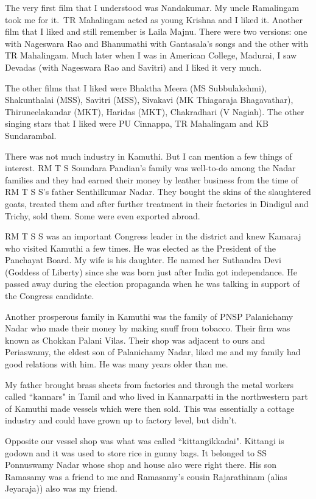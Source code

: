 The very first film that I understood was Nandakumar. My uncle 
Ramalingam took me for it.\ TR Mahalingam acted as young Krishna and I 
liked it. Another film that I liked and still remember is Laila Majnu. 
There were two versions: one with Nageswara Rao and Bhanumathi with 
Gantasala's songs and the other with TR Mahalingam. Much later when I 
was in American\- College, Madurai, I saw Devadas (with Nageswara Rao and 
Savitri) and I liked it very much.

The other films that I liked were Bhaktha Meera (MS Subbu\-lakshmi), Shakunthalai (MSS), Savitri (MSS), Sivakavi (MK Thia\-garaja Bhagavathar), Thiruneelakandar (MKT), Haridas (MKT), Chakradhari (V Nagiah). The other singing stars that I liked were PU Cinnappa, TR Mahalingam and KB Sunda\-rambal.

There was not much industry in Kamuthi. But I can mention a few things 
of interest. RM T S Soundara Pandian's family was well-to-do among the 
Nadar families and they had earned their money by leather business from 
the time of RM T S S's father Senthilkumar Nadar. They bought the skins 
of the slaughtered goats, treated them and after further treatment in 
their factories in Dindigul and Trichy, sold them. Some were even 
exported abroad.

RM T S S was an important Congress leader in the district and knew 
Kamaraj who visited Kamuthi a few times. He was elected as the President 
of the Panchayat Board. My wife is his daughter. He named her Suthandra 
Devi (Goddess of Liberty) since she was born just after India got 
independance. He passed away during the election propaganda when he was 
talking in support of the Congress candidate.

Another prosperous family in Kamuthi was the family of PN\-SP Palanichamy 
Nadar who made their money by making snuff from tobacco. Their firm was 
known as Chokkan Palani Vilas. Their shop was adjacent to ours and 
Periaswamy, the eldest son of Palanichamy Nadar, liked me and my family 
had good relations with him. He was many years older than me.

My father brought brass sheets from factories and through the metal 
workers called ``kannars" in Tamil and who lived in Kannarpatti in the 
northwestern part of Kamuthi made vessels which were then sold. This was 
essentially a cottage industry and could have grown up to factory level, 
but didn't.

Opposite our vessel shop was what was called ``kittangikka\-dai". Kittangi 
is godown and it was used to store rice in gunny bags. It belonged to SS 
Ponnuswamy Nadar whose shop and hou\-se also were right there. His son 
Ramasamy was a friend to me and Ramasamy's cousin Rajarathinam (alias 
Jeyaraja)) also was my friend.

